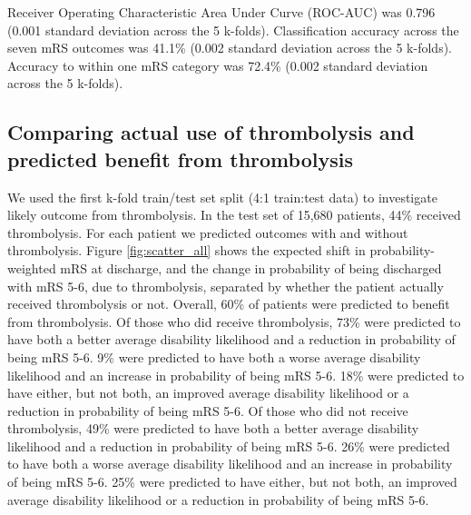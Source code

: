 Receiver Operating Characteristic Area Under Curve (ROC-AUC) was 0.796 (0.001 standard deviation across the 5 k-folds). Classification accuracy across the seven mRS outcomes was 41.1\% (0.002 standard deviation across the 5 k-folds). Accuracy to within one mRS category was 72.4\% (0.002 standard deviation across the 5 k-folds).  

\subsection{Comparing actual use of thrombolysis and predicted benefit from thrombolysis}

We used the first k-fold train/test set split (4:1 train:test data) to investigate likely outcome from thrombolysis. In the test set of 15,680 patients, 44\% received thrombolysis. For each patient we predicted outcomes with and without thrombolysis. Figure \ref{fig:scatter_all} shows the expected shift in probability-weighted mRS at discharge, and the change in probability of being discharged with mRS 5-6, due to thrombolysis, separated by whether the patient actually received thrombolysis or not. Overall, 60\% of patients were predicted to benefit from thrombolysis. Of those who did receive thrombolysis, 73\% were predicted to have both a better average disability likelihood and a reduction in probability of being mRS 5-6. 9\% were predicted to have both a worse average disability likelihood and an increase in probability of being mRS 5-6. 18\% were predicted to have either, but not both, an improved average disability likelihood or a reduction in probability of being mRS 5-6. Of those who did not receive thrombolysis, 49\% were predicted to have both a better average disability likelihood and a reduction in probability of being mRS 5-6. 26\% were predicted to have both a worse average disability likelihood and an increase in probability of being mRS 5-6. 25\% were predicted to have either, but not both, an improved average disability likelihood or a reduction in probability of being mRS 5-6.

